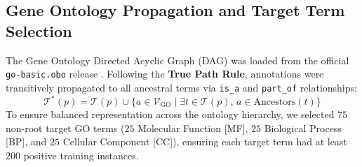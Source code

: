 \documentclass[twocolumn,10pt]{article}
\begin{document}
\subsection{Gene Ontology Propagation and Target Term Selection}
The Gene Ontology Directed Acyclic Graph (DAG) was loaded from the official \texttt{go-basic.obo} release \cite{go2021resource}. Following the \textbf{True Path Rule}, annotations were transitively propagated to all ancestral terms via \texttt{is\_a} and \texttt{part\_of} relationships:
\begin{equation}
\mathcal{T}^*(p) = \mathcal{T}(p) \cup \{ a \in \mathcal{V}_{\text{GO}} \mid \exists t \in \mathcal{T}(p), \, a \in \text{Ancestors}(t) \}
\end{equation}
To ensure balanced representation across the ontology hierarchy, we selected $75$ non-root target GO terms ($25$ Molecular Function [MF], $25$ Biological Process [BP], and $25$ Cellular Component [CC]), ensuring each target term had at least $200$ positive training instances.
\end{document}
